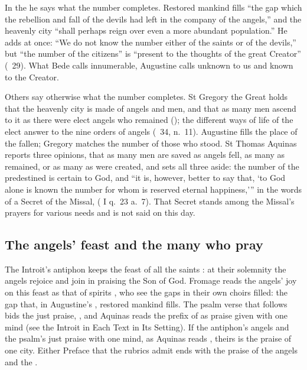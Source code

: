In the  he says what the number completes. Restored mankind
fills ``the gap which the rebellion and fall of the devils had left in the
company of the angels,'' and the heavenly city ``shall perhaps reign over even
a more abundant population.'' He adds at once: ``We do not know the number
either of the saints or of the devils,'' but ``the number of the citizens'' is
``present to the thoughts of the great Creator'' (\ 29). What Bede
calls innumerable, Augustine calls unknown to us and known to the Creator.

Others say otherwise what the number completes. St Gregory the Great holds
that the heavenly city is made of angels and men, and that as many men ascend
to it as there were elect angels who remained (); the
different ways of life of the elect answer to the nine orders of angels
(\ 34, n.~11). Augustine fills the place of the fallen;
Gregory matches the number of those who stood. St Thomas Aquinas reports three
opinions, that as many men are saved as angels fell, as many as remained, or
as many as were created, and sets all three aside: the number of the
predestined is certain to God, and ``it is, however, better to say that, `to
God alone is known the number for whom is reserved eternal happiness,''' in
the words of a Secret of the Missal,  ( I q.~23 a.~7).
That Secret stands among the Missal's prayers for various needs and is not
said on this day.

\subsection{The angels' feast and the many who pray}
\label{sec:sealed-elements}

The Introit's antiphon keeps the feast of all the saints : at their solemnity the
angels rejoice and join in praising the Son of God. Fromage reads the
angels' joy on this feast as that of spirits , who see the gaps in their own choirs filled: the gap
that, in Augustine's , restored mankind fills. The psalm
verse that follows bids the just praise, , and
Aquinas reads the prefix of  as praise given with one mind
(see the Introit in Each Text in Its Setting). If the antiphon's angels and
the psalm's just praise with one mind, as Aquinas reads ,
theirs is the praise of one city. Either Preface that the rubrics admit ends
with the praise of the angels and the .

